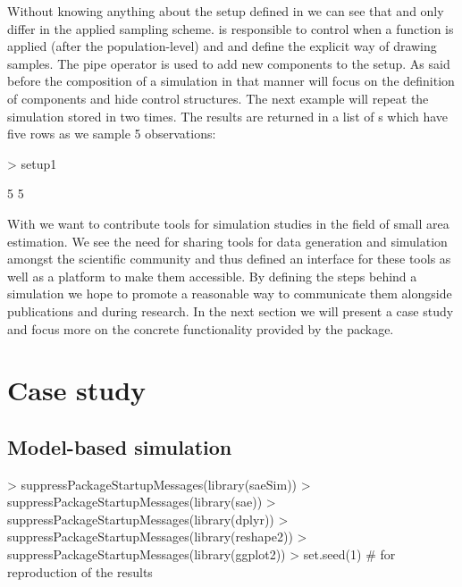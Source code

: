 \documentclass[article]{ajs}
\begin{document}
Without knowing anything about the setup defined in  we can see that  and  only differ in the applied sampling scheme.  is responsible to control when a function is applied (after the population-level) and  and  define the explicit way of drawing samples. The pipe operator \proglang{\%>\%} is used to add new components to the setup. As said before the composition of a simulation in that manner will focus on the definition of components and hide control structures. The next example will repeat the simulation stored in  two times. The results are returned in a list of s which have five rows as we sample 5 observations:

\begin{Schunk}
\begin{Sinput}
> setup1 %
\end{Sinput}
\begin{Soutput}
[1] 5 5
\end{Soutput}
\end{Schunk}

With  we want to contribute tools for simulation studies in the field of small area estimation. We see the need for sharing tools for data generation and simulation amongst the scientific community and thus defined an interface for these tools as well as a platform to make them accessible. By defining the steps behind a simulation we hope to promote a reasonable way to communicate them alongside publications and during research. In the next section we will present a case study and focus more on the concrete functionality provided by the package.

\section{Case study}
\label{sec:caseStudy}
\subsection{Model-based simulation}
\begin{Schunk}
\begin{Sinput}
> suppressPackageStartupMessages(library(saeSim))
> suppressPackageStartupMessages(library(sae))
> suppressPackageStartupMessages(library(dplyr))
> suppressPackageStartupMessages(library(reshape2))
> suppressPackageStartupMessages(library(ggplot2))
> set.seed(1) # for reproduction of the results
\end{Sinput}
\end{Schunk}
\end{document}
